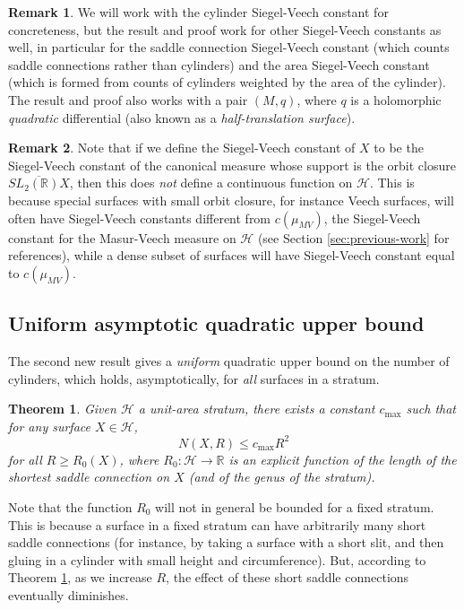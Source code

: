 \documentclass{article}
\newtheorem{thm}{Theorem}[section]
\theoremstyle{definition}
\newtheorem{rmk}{Remark}[section]
\begin{document}
\begin{rmk} 
We will work with the cylinder Siegel-Veech constant for concreteness, but the result and proof work for other Siegel-Veech constants as well, in particular for the saddle connection Siegel-Veech constant (which counts saddle connections rather than cylinders) and the area Siegel-Veech constant (which is formed from counts of cylinders weighted by the area of the cylinder).   The result and proof also works with a pair $(M,q)$, where $q$ is a holomorphic \emph{quadratic} differential (also known as a \emph{half-translation surface}).  
\end{rmk}

\begin{rmk}
  Note that if we define the Siegel-Veech constant of $X$ to be the Siegel-Veech constant of the canonical measure whose support is the orbit closure $\overline{SL_2(\mathbb{R})X}$, then this does \emph{not} define a continuous function on $\mathcal{H}$.  This is because special surfaces with small orbit closure, for instance Veech surfaces, will often have Siegel-Veech constants different from $c(\mu_{MV})$, the Siegel-Veech constant for the Masur-Veech measure on $\mathcal{H}$ (see Section \ref{sec:previous-work} for references), while a dense subset of surfaces will have Siegel-Veech constant equal to $c(\mu_{MV})$. 
\end{rmk}

\subsection{Uniform asymptotic quadratic upper bound}

The second new result gives a \emph{uniform} quadratic upper bound on the number of cylinders, which holds, asymptotically, for \emph{all} surfaces in a stratum.  

\begin{thm}
  Given $\mathcal{H}$ a unit-area stratum, there exists a constant $c_{\max}$ such that for any surface $X\in \mathcal{H}$, 
$$N(X,R) \le c_{\max} R^2$$
for all $R\ge R_0(X)$, where $R_0: \mathcal{H} \to \mathbb{R}$ is an explicit function of the length of the shortest saddle connection on $X$ (and of the genus of the stratum).  
\label{thm:uniform}
\end{thm}

Note that the  function $R_0$ will not in general be bounded for a fixed stratum.  This is because a surface in a fixed stratum can have arbitrarily many short saddle connections (for instance, by taking a surface with a short slit, and then gluing in a cylinder with small height and circumference).  But, according to Theorem \ref{thm:uniform}, as we increase $R$, the effect of these short saddle connections eventually diminishes.  
\end{document}
